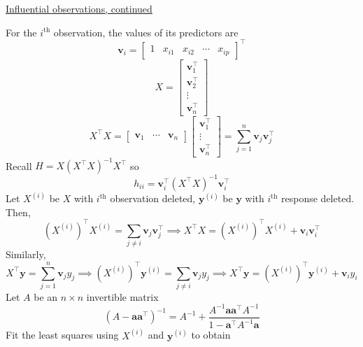 \underline{Influential observations, continued}

For the $ i^{\text{th}} $ observation, the values
of its predictors are
\[ \symbf{v}_i=\begin{bmatrix}
        1 & x_{i1} & x_{i2} & \cdots & x_{i p}
    \end{bmatrix}^\top \]
\[ X=\begin{bmatrix}
        \symbf{v}_1^\top \\
        \symbf{v}_2^\top \\
        \vdots           \\
        \symbf{v}_n^\top
    \end{bmatrix} \]
\[ X^\top X=\begin{bmatrix}
        \symbf{v}_1 & \cdots & \symbf{v}_n
    \end{bmatrix}\begin{bmatrix}
        \symbf{v}_1^\top \\
        \vdots           \\
        \symbf{v}_n^\top
    \end{bmatrix}=\sum_{j=1}^{n}\symbf{v}_j\symbf{v}_j^\top \]
Recall $ H=X(X^\top X)^{-1}X^\top $ so
\[ h_{ii}=\symbf{v}_i^\top (X^\top X)^{-1}\symbf{v}_i^\top \]
Let $ X^{(i)} $ be $ X $ with $ i^{\text{th}} $ observation
deleted, $ \symbf{y}^{(i)} $ be $ \symbf{y} $ with $ i^{\text{th}} $
response deleted. Then,
\[ (X^{(i)})^{\top}X^{(i)}=\sum_{j\neq i}\symbf{v}_j\symbf{v}_j^\top
    \implies X^\top X=(X^{(i)})^\top X^{(i)}+\symbf{v}_i\symbf{v}_i^\top \]
Similarly,
\[ X^\top \symbf{y}=\sum_{j=1}^{n} \symbf{v}_j y_j\implies
    (X^{(i)})^\top \symbf{y}^{(i)}=\sum_{j\neq i}\symbf{v}_j y_j
    \implies X^{\top}\symbf{y}=(X^{(i)})^\top\symbf{y}^{(i)}+\symbf{v}_i y_i \]
Let $ A $ be an $ n\times n $ invertible matrix
\[ (A-\symbf{a}\symbf{a}^\top)^{-1}=A^{-1}+\frac{A^{-1}\symbf{a}\symbf{a}^\top
        A^{-1}}{1-\symbf{a}^\top A^{-1}\symbf{a}}  \]
Fit the least squares using $ X^{(i)} $ and $ \symbf{y}^{(i)} $
to obtain
